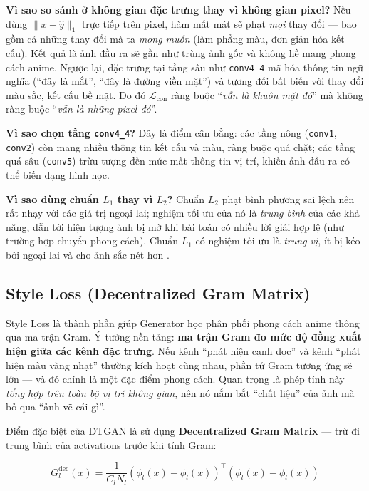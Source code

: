 \textbf{Vì sao so sánh ở không gian đặc trưng thay vì không gian pixel?} Nếu dùng $\|x - \widehat{y}\|_1$ trực tiếp trên pixel, hàm mất mát sẽ phạt \textit{mọi} thay đổi --- bao gồm cả những thay đổi mà ta \textit{mong muốn} (làm phẳng màu, đơn giản hóa kết cấu). Kết quả là ảnh đầu ra sẽ gần như trùng ảnh gốc và không hề mang phong cách anime. Ngược lại, đặc trưng tại tầng sâu như \texttt{conv4\_4} mã hóa thông tin ngữ nghĩa (``đây là mắt'', ``đây là đường viền mặt'') và tương đối bất biến với thay đổi màu sắc, kết cấu bề mặt. Do đó $\mathcal{L}_{\text{con}}$ ràng buộc ``\textit{vẫn là khuôn mặt đó}'' mà không ràng buộc ``\textit{vẫn là những pixel đó}''.

\textbf{Vì sao chọn tầng \texttt{conv4\_4}?} Đây là điểm cân bằng: các tầng nông (\texttt{conv1}, \texttt{conv2}) còn mang nhiều thông tin kết cấu và màu, ràng buộc quá chặt; các tầng quá sâu (\texttt{conv5}) trừu tượng đến mức mất thông tin vị trí, khiến ảnh đầu ra có thể biến dạng hình học.

\textbf{Vì sao dùng chuẩn $L_1$ thay vì $L_2$?} Chuẩn $L_2$ phạt bình phương sai lệch nên rất nhạy với các giá trị ngoại lai; nghiệm tối ưu của nó là \textit{trung bình} của các khả năng, dẫn tới hiện tượng ảnh bị mờ khi bài toán có nhiều lời giải hợp lệ (như trường hợp chuyển phong cách). Chuẩn $L_1$ có nghiệm tối ưu là \textit{trung vị}, ít bị kéo bởi ngoại lai và cho ảnh sắc nét hơn \cite{Johnson2016}.

\subsection{Style Loss (Decentralized Gram Matrix)}
\label{subsec:style_loss}

Style Loss là thành phần giúp Generator học phân phối phong cách anime thông qua ma trận Gram. Ý tưởng nền tảng: \textbf{ma trận Gram đo mức độ đồng xuất hiện giữa các kênh đặc trưng}. Nếu kênh ``phát hiện cạnh dọc'' và kênh ``phát hiện màu vàng nhạt'' thường kích hoạt cùng nhau, phần tử Gram tương ứng sẽ lớn --- và đó chính là một đặc điểm phong cách. Quan trọng là phép tính này \textit{tổng hợp trên toàn bộ vị trí không gian}, nên nó nắm bắt ``chất liệu'' của ảnh mà bỏ qua ``ảnh vẽ cái gì''.

Điểm đặc biệt của DTGAN là sử dụng \textbf{Decentralized Gram Matrix} --- trừ đi trung bình của activations trước khi tính Gram:

\begin{equation}
\label{eq:decentralized_gram}
G_l^{\text{dec}}(x) = \frac{1}{C_l N_l} \left(\phi_l(x) - \bar{\phi}_l(x)\right)^{\top} \left(\phi_l(x) - \bar{\phi}_l(x)\right)
\end{equation}

